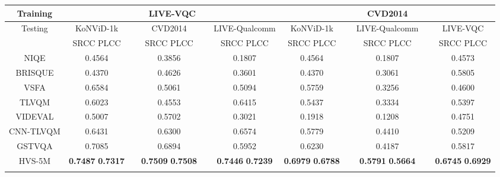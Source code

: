 \documentclass[journal]{IEEEtran}
\begin{document}
\begin{table*}[]
{\begin{tabular}{c|ccccc|ccccc}
Training                 & \multicolumn{5}{c|}{LIVE-VQC}                         & \multicolumn{5}{c}{CVD2014}                          \\ \hline
\multirow{2}{*}{Testing} & KoNViD-1k      &  & CVD2014       &  & LIVE-Qualcomm & KoNViD-1k      &  & LIVE-Qualcomm &  & LIVE-VQC      \\ \cline{2-2} \cline{4-4} \cline{6-7} \cline{9-9} \cline{11-11}
                         & SRCC \quad   PLCC   &  & SRCC \quad   PLCC  &  & SRCC \quad   PLCC  & SRCC  \quad  PLCC   &  & SRCC   \quad  PLCC  &  & SRCC  \quad  PLCC  \\ \hline
NIQE     \cite{NIQE}                & 0.4564 \quad 0.3619  &  & 0.3856 \quad 0.4410 &  & 0.1807 \quad 0.1672 & 0.4564 \quad 0.3619  &  & 0.1807 \quad 0.1672 &  & 0.4573 \quad 0.4025 \\
BRISQUE  \cite{BRISQUE}                & 0.4370 \quad 0.4274  &  & 0.4626 \quad 0.5060 &  & 0.3601 \quad 0.3303 & 0.4370 \quad 0.4274  &  & 0.3061 \quad 0.3303 &  & 0.5805 \quad 0.5788 \\
VSFA    \cite{VSFA}                 & 0.6584 \quad 0.6666  &  & 0.5061 \quad 0.5415 &  & 0.5094 \quad 0.5350 & 0.5759 \quad 0.5636  &  & 0.3256 \quad 0.3718 &  & 0.4600 \quad 0.4783 \\
TLVQM    \cite{TLVQM}                & 0.6023 \quad 0.5943  &  & 0.4553 \quad 0.4749 &  & 0.6415 \quad 0.6534 & 0.5437 \quad 0.5052  &  & 0.3334 \quad 0.3838 &  & 0.5397 \quad 0.5527 \\
VIDEVAL   \cite{VIDEVAL}               & 0.5007 \quad -0.4841 &  & 0.5702 \quad 0.5171 &  & 0.3021 \quad 0.3602 & 0.1918 \quad -0.3260 &  & 0.1208 \quad 0.3315 &  & 0.4751 \quad 0.5167 \\
CNN-TLVQM   \cite{CNN-TLVQM}             & 0.6431 \quad 0.6304  &  & 0.6300 \quad 0.6568 &  & 0.6574 \quad 0.6696 & 0.5779 \quad 0.5489  &  & 0.4410 \quad 0.4712 &  & 0.5209 \quad 0.5592 \\
GSTVQA  \cite{Chen2021}               & 0.7085 \quad 0.7074  &  & 0.6894 \quad 0.6645 &  & 0.5952 \quad 0.6245 & 0.6230 \quad 0.5764  &  &  0.4187 \quad 0.4965 &  & 0.5817 \quad 0.5751 \\
HVS-5M                 &  \textbf{0.7487} \quad  \textbf{0.7317}              &  &   \textbf{0.7509} \quad  \textbf{0.7508}            &  &   \textbf{0.7446} \quad  \textbf{0.7239}            &     \textbf{0.6979} \quad  \textbf{0.6788}           &  &   \textbf{0.5791} \quad  \textbf{0.5664          } &  &              \textbf{0.6745} \quad  \textbf{0.6929} \\ \Xhline{1.1pt}
\end{tabular}}
\end{table*}
\end{document}
